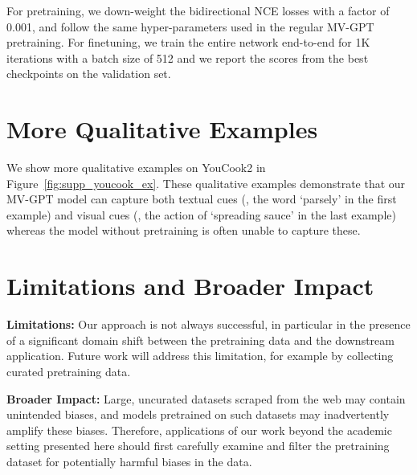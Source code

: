 \documentclass[10pt,twocolumn,letterpaper]{article}
\begin{document}
For pretraining, we down-weight the bidirectional NCE losses with a factor of 0.001, and follow the same hyper-parameters used in the regular MV-GPT pretraining.
For finetuning, we train the entire network end-to-end for 1K iterations with a batch size of 512 and we report the scores from the best checkpoints on the validation set.










\section{More Qualitative Examples} \label{sec:supp-qual}

We show more qualitative examples on YouCook2 in Figure~\ref{fig:supp_youcook_ex}. 
These qualitative examples demonstrate that our MV-GPT model can capture both textual cues (\eg, the word `parsely' in the first example) and visual cues (\eg, the action of `spreading sauce' in the last example) whereas the model without pretraining is often unable to capture these.


\section{Limitations and Broader Impact}
\label{sec:limitation}
\noindent \textbf{Limitations:} Our approach is not always successful, in particular in the presence of a significant domain shift between the pretraining data and the downstream application. Future work will address this limitation, for example by collecting curated pretraining data. 


\noindent\textbf{Broader Impact:} 
Large, uncurated datasets scraped from the web may contain unintended biases, and models pretrained on such datasets may inadvertently amplify these biases.
Therefore, applications of our work beyond the academic setting presented here should first carefully examine and filter the pretraining dataset for potentially harmful biases in the data. 



 
\end{document}
